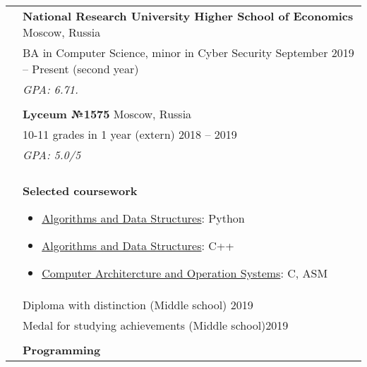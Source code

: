 \documentclass[letterpaper, 11pt]{article}
\begin{document}
\begin{longtable}{p{1.3in}p{4.8in}}




\color{OliveGreen}{Education} 
& \textbf{National Research University Higher School of Economics} \hfill Moscow, Russia\\
& BA in Computer Science, minor in Cyber Security \hfill September 2019 -- Present (second year) \\
& {\it GPA: 6.71.}\\
& \\

& \textbf{Lyceum №1575} \hfill Moscow, Russia\\
& 10-11 grades in 1 year (extern) \hfill 2018 -- 2019 \\
& {\it GPA: 5.0/5}\\
& \\

& \textbf{Selected coursework}
\begin{itemize}[noitemsep,leftmargin=*]
\item \underline{Algorithms and Data Structures}: Python
\item \underline{Algorithms and Data Structures}: C++
\item \underline{Computer Architercture and Operation Systems}: C, ASM
\end{itemize} \\


{\color{OliveGreen}{Honors and}} 
& Diploma with distinction (Middle school) \hfill 2019\\
{\color{OliveGreen}{scholarships}} 
& Medal for studying achievements (Middle school)\hfill 2019 \\
& \\


{\color{OliveGreen}{Skills}} 
& \textbf{Programming}


\end{longtable}
\end{document}
